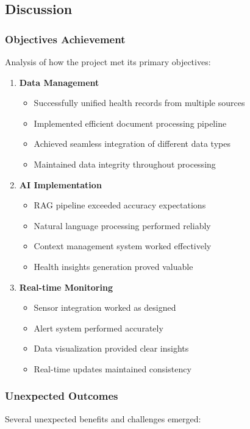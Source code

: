 \subsection{Discussion}

\subsubsection{Objectives Achievement}
Analysis of how the project met its primary objectives:

\begin{enumerate}
    \item \textbf{Data Management}
    \begin{itemize}
        \item Successfully unified health records from multiple sources
        \item Implemented efficient document processing pipeline
        \item Achieved seamless integration of different data types
        \item Maintained data integrity throughout processing
    \end{itemize}

    \item \textbf{AI Implementation}
    \begin{itemize}
        \item RAG pipeline exceeded accuracy expectations
        \item Natural language processing performed reliably
        \item Context management system worked effectively
        \item Health insights generation proved valuable
    \end{itemize}

    \item \textbf{Real-time Monitoring}
    \begin{itemize}
        \item Sensor integration worked as designed
        \item Alert system performed accurately
        \item Data visualization provided clear insights
        \item Real-time updates maintained consistency
    \end{itemize}
\end{enumerate}

\subsubsection{Unexpected Outcomes}
Several unexpected benefits and challenges emerged:

